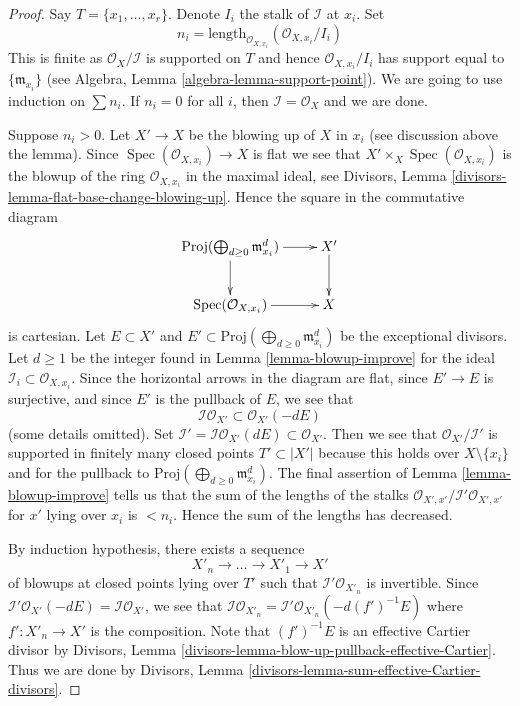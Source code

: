 \documentclass{stacks-project}
\theoremstyle{plain}
\theoremstyle{definition}
\theoremstyle{remark}
\numberwithin{equation}{subsection}
\def\Spec{\mathop{\mathrm{Spec}}}
\begin{document}
\begin{proof}
Say $T = \{x_1, \ldots, x_r\}$. Denote $I_i$ the stalk of $\mathcal{I}$ at
$x_i$. Set
$$
n_i = \text{length}_{\mathcal{O}_{X, x_i}}(\mathcal{O}_{X, x_i}/I_i)
$$
This is finite as $\mathcal{O}_X/\mathcal{I}$ is supported on $T$
and hence $\mathcal{O}_{X, x_i}/I_i$ has support equal to
$\{\mathfrak m_{x_i}\}$ (see Algebra, Lemma \ref{algebra-lemma-support-point}).
We are going to use induction on $\sum n_i$. If $n_i = 0$ for all
$i$, then $\mathcal{I} = \mathcal{O}_X$ and we are done.

\medskip\noindent
Suppose $n_i > 0$. Let $X' \to X$ be the blowing up of $X$ in $x_i$
(see discussion above the lemma).
Since $\Spec(\mathcal{O}_{X, x_i}) \to X$ is flat we see that
$X' \times_X \Spec(\mathcal{O}_{X, x_i})$ is the blowup of
the ring $\mathcal{O}_{X, x_i}$ in the maximal ideal, see
Divisors, Lemma
\ref{divisors-lemma-flat-base-change-blowing-up}.
Hence the square in the commutative diagram
$$
\xymatrix{
\text{Proj}(\bigoplus\nolimits_{d \geq 0} \mathfrak m_{x_i}^d) \ar[r] \ar[d] &
X' \ar[d] \\
\Spec(\mathcal{O}_{X, x_i}) \ar[r] & X
}
$$
is cartesian. Let $E \subset X'$ and
$E' \subset \text{Proj}(\bigoplus\nolimits_{d \geq 0} \mathfrak m_{x_i}^d)$
be the exceptional divisors. Let $d \geq 1$ be the integer found in
Lemma \ref{lemma-blowup-improve} for the ideal
$\mathcal{I}_i \subset \mathcal{O}_{X, x_i}$.
Since the horizontal arrows in the diagram are flat, since
$E' \to E$ is surjective, and since $E'$ is the pullback of $E$, we see that
$$
\mathcal{I}\mathcal{O}_{X'} \subset \mathcal{O}_{X'}(-dE)
$$
(some details omitted).
Set $\mathcal{I}' = \mathcal{I}\mathcal{O}_{X'}(dE) \subset \mathcal{O}_{X'}$.
Then we see that $\mathcal{O}_{X'}/\mathcal{I}'$ is supported in finitely
many closed points $T' \subset |X'|$ because this holds over
$X \setminus \{x_i\}$ and for the pullback to
$\text{Proj}(\bigoplus\nolimits_{d \geq 0} \mathfrak m_{x_i}^d)$.
The final assertion of Lemma \ref{lemma-blowup-improve}
tells us that the sum of the lengths of the stalks
$\mathcal{O}_{X', x'}/\mathcal{I}'\mathcal{O}_{X', x'}$
for $x'$ lying over $x_i$ is $< n_i$. Hence the sum of the lengths
has decreased.

\medskip\noindent
By induction hypothesis, there exists a sequence
$$
X'_n \to \ldots \to X'_1 \to X'
$$
of blowups at closed points lying over $T'$ such that
$\mathcal{I}'\mathcal{O}_{X'_n}$ is invertible. Since
$\mathcal{I}'\mathcal{O}_{X'}(-dE) = \mathcal{I}\mathcal{O}_{X'}$, we see
that $\mathcal{I}\mathcal{O}_{X'_n} =
\mathcal{I}'\mathcal{O}_{X'_n}(-d(f')^{-1}E)$
where $f' : X'_n \to X'$ is the composition.
Note that $(f')^{-1}E$ is an effective Cartier divisor by
Divisors, Lemma \ref{divisors-lemma-blow-up-pullback-effective-Cartier}.
Thus we are done by
Divisors, Lemma \ref{divisors-lemma-sum-effective-Cartier-divisors}.
\end{proof}
\end{document}
